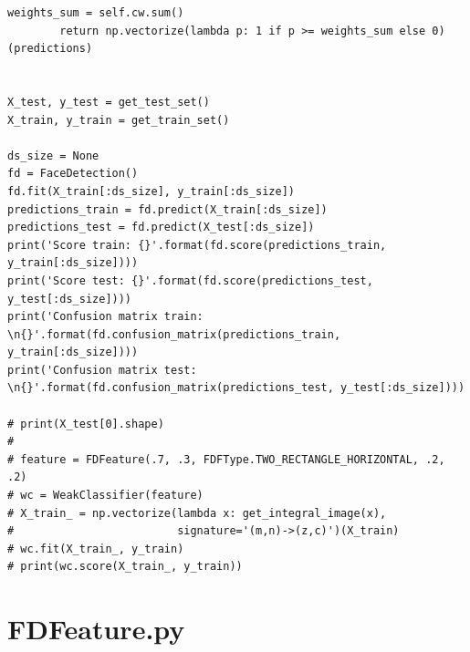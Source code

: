 \begin{lstlisting}[style=py]
        weights_sum = self.cw.sum()
        return np.vectorize(lambda p: 1 if p >= weights_sum else 0)(predictions)


X_test, y_test = get_test_set()
X_train, y_train = get_train_set()

ds_size = None
fd = FaceDetection()
fd.fit(X_train[:ds_size], y_train[:ds_size])
predictions_train = fd.predict(X_train[:ds_size])
predictions_test = fd.predict(X_test[:ds_size])
print('Score train: {}'.format(fd.score(predictions_train, y_train[:ds_size])))
print('Score test: {}'.format(fd.score(predictions_test, y_test[:ds_size])))
print('Confusion matrix train: \n{}'.format(fd.confusion_matrix(predictions_train, y_train[:ds_size])))
print('Confusion matrix test: \n{}'.format(fd.confusion_matrix(predictions_test, y_test[:ds_size])))

# print(X_test[0].shape)
#
# feature = FDFeature(.7, .3, FDFType.TWO_RECTANGLE_HORIZONTAL, .2, .2)
# wc = WeakClassifier(feature)
# X_train_ = np.vectorize(lambda x: get_integral_image(x),
#                         signature='(m,n)->(z,c)')(X_train)
# wc.fit(X_train_, y_train)
# print(wc.score(X_train_, y_train))

\end{lstlisting}

\section*{FDFeature.py}

